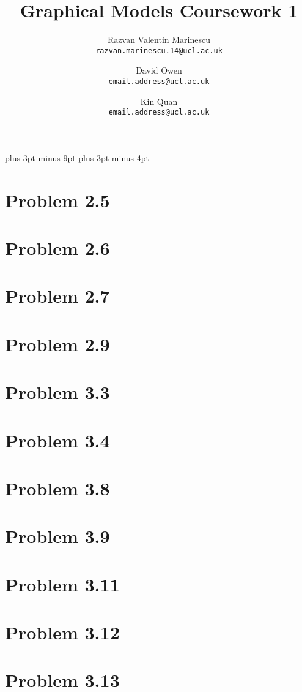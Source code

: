 \documentclass[11pt,a4paper,oneside]{report}
\title{Graphical Models Coursework 1}
\author{
    Razvan Valentin Marinescu\\
    \texttt{razvan.marinescu.14@ucl.ac.uk}
    \and
    David Owen\\
    \texttt{email.address@ucl.ac.uk}
    \and
    Kin Quan\\
    \texttt{email.address@ucl.ac.uk}
}
\begin{document}
\belowdisplayskip=12pt plus 3pt minus 9pt
\belowdisplayshortskip=7pt plus 3pt minus 4pt

\maketitle{}


\section*{Problem 2.5}


\section*{Problem 2.6}


\section*{Problem 2.7}


\section*{Problem 2.9}


\section*{Problem 3.3}


\section*{Problem 3.4}


\section*{Problem 3.8}


\section*{Problem 3.9}


\section*{Problem 3.11}


\section*{Problem 3.12}


\section*{Problem 3.13}
\end{document}
